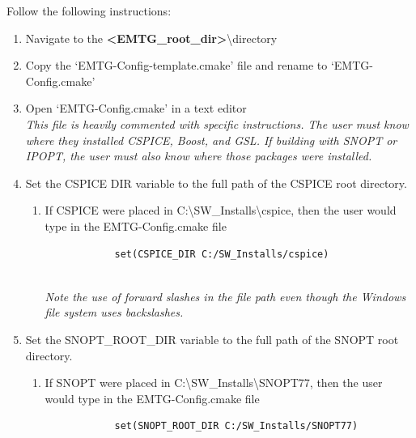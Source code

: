
Follow the following instructions:
\begin{enumerate}
	\item Navigate to the \textbf{\textless EMTG\_root\_dir\textgreater}\textbackslash directory
	\item Copy the `EMTG-Config-template.cmake' file and rename to `EMTG-Config.cmake'
	\item Open `EMTG-Config.cmake' in a text editor \\ \emph{This file is heavily commented with specific instructions. The user must know where they installed CSPICE, Boost, and GSL. If building with SNOPT or IPOPT, the user must also know where those packages were installed.}
	\item Set the CSPICE DIR variable to the full path of the CSPICE root directory.
	\begin{enumerate}
		\item If CSPICE were placed in C:\textbackslash SW\_Installs\textbackslash cspice, then the user would type in the EMTG-Config.cmake file \\
		\begin{verbatim}
			set(CSPICE_DIR C:/SW_Installs/cspice)
			 
		\end{verbatim}
		
		\emph{Note the use of forward slashes in the file path even though the Windows file system uses backslashes.}
	\end{enumerate}
	\item Set the SNOPT\_ROOT\_DIR variable to the full path of the SNOPT root directory.
	\begin{enumerate}
		\item If SNOPT  were placed in C:\textbackslash SW\_Installs\textbackslash SNOPT77, then the user would type in the EMTG-Config.cmake file \\
		\begin{verbatim}
			set(SNOPT_ROOT_DIR C:/SW_Installs/SNOPT77)
			 
		\end{verbatim}
		

\end{enumerate}
\end{enumerate}
